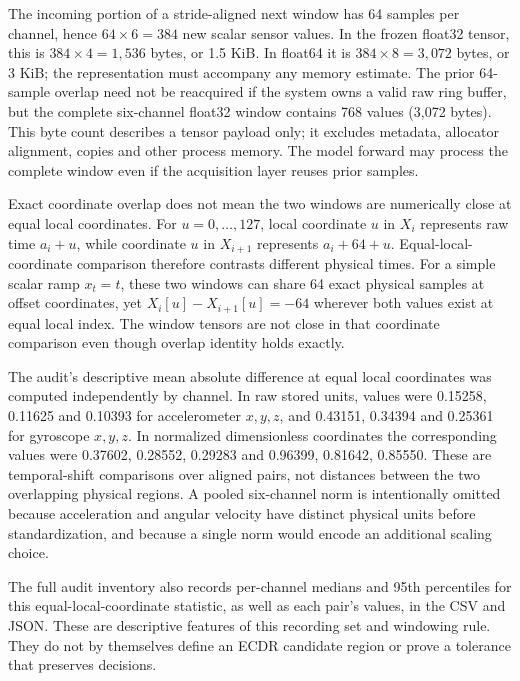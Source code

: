 \documentclass[11pt,a4paper]{article}
\begin{document}
The incoming portion of a stride-aligned next window has 64 samples per channel, hence $64\times6=384$ new scalar sensor values. In the frozen float32 tensor, this is $384\times4=1,536$ bytes, or 1.5 KiB. In float64 it is $384\times8=3,072$ bytes, or 3 KiB; the representation must accompany any memory estimate. The prior 64-sample overlap need not be reacquired if the system owns a valid raw ring buffer, but the complete six-channel float32 window contains 768 values (3,072 bytes). This byte count describes a tensor payload only; it excludes metadata, allocator alignment, copies and other process memory. The model forward may process the complete window even if the acquisition layer reuses prior samples.

Exact coordinate overlap does not mean the two windows are numerically close at equal local coordinates. For $u=0,\ldots,127$, local coordinate $u$ in $X_i$ represents raw time $a_i+u$, while coordinate $u$ in $X_{i+1}$ represents $a_i+64+u$. Equal-local-coordinate comparison therefore contrasts different physical times. For a simple scalar ramp $x_t=t$, these two windows can share 64 exact physical samples at offset coordinates, yet $X_i[u]-X_{i+1}[u]=-64$ wherever both values exist at equal local index. The window tensors are not close in that coordinate comparison even though overlap identity holds exactly.

The audit's descriptive mean absolute difference at equal local coordinates was computed independently by channel. In raw stored units, values were 0.15258, 0.11625 and 0.10393 for accelerometer $x,y,z$, and 0.43151, 0.34394 and 0.25361 for gyroscope $x,y,z$. In normalized dimensionless coordinates the corresponding values were 0.37602, 0.28552, 0.29283 and 0.96399, 0.81642, 0.85550. These are temporal-shift comparisons over aligned pairs, not distances between the two overlapping physical regions. A pooled six-channel norm is intentionally omitted because acceleration and angular velocity have distinct physical units before standardization, and because a single norm would encode an additional scaling choice.

The full audit inventory also records per-channel medians and 95th percentiles for this equal-local-coordinate statistic, as well as each pair's values, in the CSV and JSON. These are descriptive features of this recording set and windowing rule. They do not by themselves define an ECDR candidate region or prove a tolerance that preserves decisions.
\end{document}
